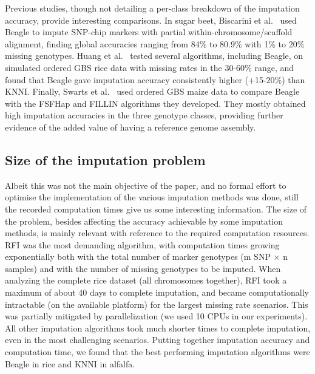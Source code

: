 Previous studies, though not detailing a per-class breakdown of the imputation accuracy, provide interesting comparisons. In sugar beet, Biscarini et al.~\cite{biscarini_genome-enabled_2014} used Beagle to impute SNP-chip markers with partial within-chromosome/scaffold alignment, finding global accuracies ranging from 84\% to 80.9\% with 1\% to 20\% missing genotypes. Huang et al.~\cite{huang_efficient_2014} tested several algorithms, including Beagle, on simulated ordered GBS rice data with missing rates in the 30-60\% range, and found that Beagle gave imputation accuracy consistently higher (+15-20\%) than KNNI. 
Finally, Swarts et al.~\cite{swarts_novel_2014} used ordered GBS maize data to compare Beagle with the FSFHap and FILLIN algorithms they developed. They mostly obtained high imputation accuracies in the three genotype classes, providing further evidence of the added value of having a reference genome assembly.

\subsection{Size of the imputation problem}
\label{sec:size_of_problem}
Albeit this was not the main objective of the paper, and no formal effort to optimise the implementation of the various imputation methods was done, still the recorded computation times give us some interesting information.
The size of the problem, besides affecting the accuracy achievable by some imputation methods, is mainly relevant with reference to the required computation resources. RFI was the most demanding algorithm, with computation times growing exponentially both with the total number of marker genotypes (m SNP $\times$ n samples) and with the number of missing genotypes to be imputed. When analyzing the complete rice dataset (all chromosomes together), RFI took a maximum of about 40 days to complete imputation, and became computationally intractable (on the available platform) for the largest missing rate scenarios. This was partially mitigated by parallelization (we used 10 CPUs in our experiments). All other imputation algorithms took much shorter times to complete imputation, even in the most challenging scenarios. Putting together imputation accuracy and computation time, we found that the best performing imputation algorithms were Beagle in rice and KNNI in alfalfa.
 
